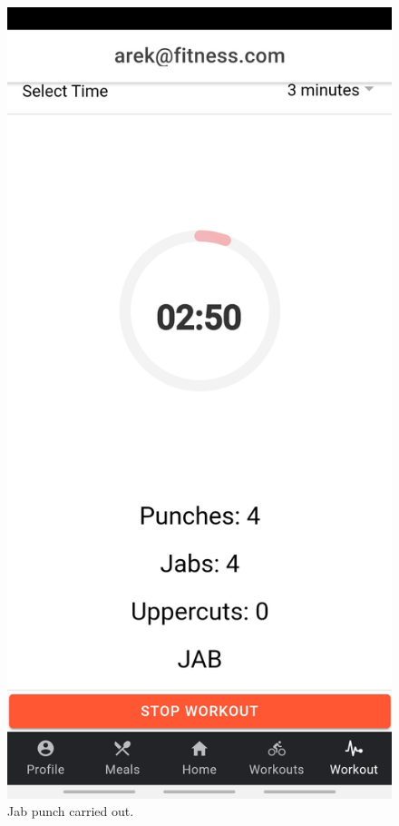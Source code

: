 \documentclass[a4paper,12pt]{report}
\begin{document}
\begin{figure}[ht] 
  \label{ fig7} 
  \begin{minipage}[b]{0.5\linewidth}
    \centering
    \includegraphics[width=.7\linewidth]{images/aplicationImages/jabDisplayed.jpeg} 
    \caption{Jab punch carried out.} 
    \vspace{4ex}
  \end{minipage}%
  \begin{minipage}[b]{0.5\linewidth}
    \centering

\end{minipage}
\end{figure}
\end{document}
